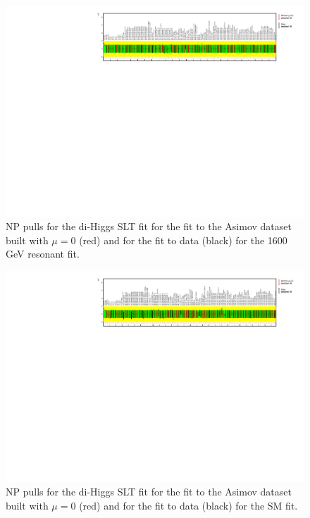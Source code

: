 \begin{figure}
\centering
\includegraphics[angle=270]{figures/results/HH/LepHad/NP_allExceptGammas_2HDM1600_SLT.pdf}
\caption{NP pulls for the di-Higgs \lephad SLT fit for the fit to the Asimov dataset built with $\mu=0$ (red) and for the fit to data (black) for the 1600 GeV resonant fit.}
\label{fig:LepHadPostfitNPPulls2HDM1600SLT}
\end{figure}

\begin{figure}
\centering
\includegraphics[angle=270]{figures/results/HH/LepHad/NP_allExceptGammas_SM_SLT.pdf}
\caption{NP pulls for the di-Higgs \lephad SLT fit for the fit to the Asimov dataset built with $\mu=0$ (red) and for the fit to data (black) for the SM fit.}
\label{fig:LepHadPostfitNPPullsSMSLT}
\end{figure}

